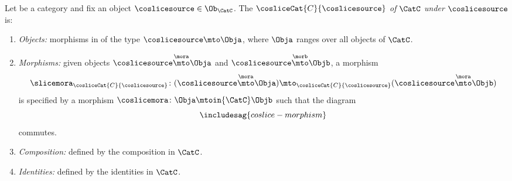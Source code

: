 \begin{ctdefinition}
    \label{def:coslice-category}

    Let \CatC be a category and fix an object $\coslicesource \in \Ob_\CatC$.
    The  $\cosliceCat{C}{\coslicesource}$ \emph{of} $\CatC$ \emph{under} $\coslicesource$ is:
    \begin{enumerate}
        \item \emph{Objects:} morphisms in \CatC of the type $\coslicesource \mto \Obja$, where $\Obja$ ranges over all objects of $\CatC$.
        \item \emph{Morphisms:} given objects $\coslicesource \overset{\mora}{\mto} \Obja$ and $\coslicesource  \overset{\morb}{\mto} \Objb$, a morphism
              \begin{equation}
                  \slicemora_{\cosliceCat{C}{\coslicesource}} \colon (\coslicesource \overset{\mora}{\mto} \Obja) \mto_{\cosliceCat{C}{\coslicesource}} (\coslicesource \overset{\mora}{\mto} \Objb)
              \end{equation}
              is specified by a morphism $\coslicemora \colon \Obja \mtoin{\CatC} \Objb$ such that the diagram
              \begin{equation}\label{eq:coslice-morphism}
                  \includesag{coslice-morphism}
              \end{equation}
              commutes.

        \item \emph{Composition:} defined by the composition in $\CatC$.
        \item \emph{Identities:} defined by the identities in $\CatC$.
    \end{enumerate}
\end{ctdefinition}

